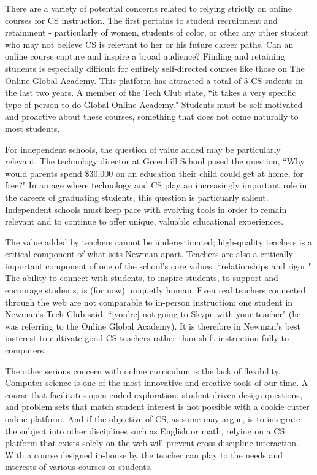 There are a variety of potential concerns related to relying strictly on online courses for CS instruction. The first pertains to student recruitment and retainment - particularly of women, students of color, or other any other student who may not believe CS is relevant to her or his future career paths. Can an online course capture and inspire a broad audience? Finding and retaining students is especially difficult for entirely self-directed courses like those on The Online Global Academy. This platform has attracted a total of 5 CS sudents in the last two years. A member of the Tech Club state, ``it takes a very specific type of person to do Global Online Academy." Students must be self-motivated and proactive about these courses, something that does not come naturally to most students.\par
For independent schools, the question of value added may be particularly relevant. The technology director at Greenhill School posed the question, ``Why would parents spend \$30,000 on an education their child could get at home, for free?" In an age where technology and CS play an increasingly important role in the careers of graduating students, this question is particuarly salient. Independent schools must keep pace with evolving tools in order to remain relevant and to continue to offer unique, valuable educational experiences. \par
The value added by teachers cannot be underestimated; high-quality teachers is a critical component of what sets Newman apart. Teachers are also a critically-important component of one of the school's core values: ``relationships and rigor." The ability to connect with students, to inspire students, to support and encourage students, is (for now) uniquetly human. Even real teachers connected through the web are not comparable to in-person instruction; one student in Newman's Tech Club said, ``[you're] not going to Skype with your teacher" (he was referring to the Online Global Academy). It is therefore in Newman's best insterest to cultivate good CS teachers rather than shift instruction fully to computers.\par
 The other serious concern with online curriculum is the lack of flexibility. Computer science is one of the most innovative and creative tools of our time. A course that facilitates open-ended exploration, student-driven design questions, and problem sets that match student interest is not possible with a cookie cutter online platform. And if the objective of CS, as some may argue, is to integrate the subject into other disciplines such as English or math, relying on a CS platform that exists solely on the web will prevent cross-discipline interaction. With a course designed in-house by the teacher can play to the needs and interests of various courses or students.\par 
